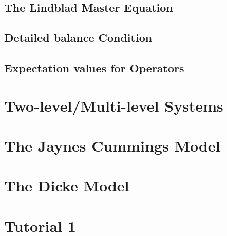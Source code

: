 \documentclass{scrartcl}
\newcommand{\1}{\mathbbm{1}}
\begin{document}
\subsection{The Lindblad Master Equation}
\subsection{Detailed balance Condition}
\subsection{Expectation values for Operators}
\section{Two-level/Multi-level Systems}
\section{The Jaynes Cummings Model}
\section{The Dicke Model}
\section{Tutorial 1}
\end{document}
